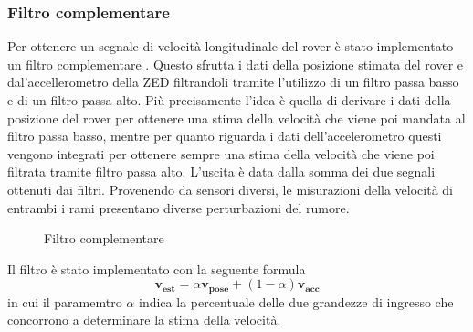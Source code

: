 \subsubsection{Filtro complementare}
Per ottenere un segnale di velocità longitudinale del rover è stato implementato un filtro complementare \cite{Filtrocompelmentare}. Questo sfrutta i dati della posizione stimata del rover e dal'accellerometro della ZED filtrandoli tramite l'utilizzo di un filtro passa basso e di un filtro passa alto. Più precisamente l'idea è quella di derivare i dati della posizione del rover per ottenere una stima della velocità che viene poi mandata al filtro passa basso, mentre per quanto riguarda i dati dell'accelerometro questi vengono integrati per ottenere sempre una stima della velocità che viene poi filtrata tramite filtro passa alto.
L'uscita è data dalla somma dei due segnali ottenuti dai filtri.
Provenendo da sensori diversi, le misurazioni della velocità di entrambi i rami presentano diverse perturbazioni del rumore.
\begin{figure} [H]
    \centering
    
    \caption{Filtro complementare}
    \label{fig:Filtro complementare}
\end{figure} 
\noindent
Il filtro è stato implementato con la seguente formula
\begin{equation}
\boldsymbol{v_{est}}=\alpha \boldsymbol{v_{pose}}+(1-\alpha) \boldsymbol{v_{acc}}
\end{equation} 
in cui il paramemtro $\alpha$ indica la percentuale delle due grandezze di ingresso che concorrono a determinare la stima della velocità.

